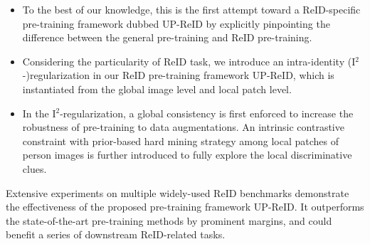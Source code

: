 \documentclass[10pt,twocolumn,letterpaper]{article}
\begin{document}
\begin{itemize}

\item To the best of our knowledge, this is the first attempt toward a ReID-specific pre-training framework dubbed UP-ReID by explicitly pinpointing the difference between the general pre-training and ReID pre-training.


\item Considering the particularity of ReID task, we introduce an intra-identity (I$^2$-)regularization in our ReID pre-training framework UP-ReID, which is instantiated from the global image level and local patch level.


\item In the I$^2$-regularization, a global consistency is first enforced to increase the robustness of pre-training to data augmentations. An intrinsic contrastive constraint with prior-based hard mining strategy among local patches of person images is further introduced to fully explore the local discriminative clues.




\end{itemize}

Extensive experiments on multiple widely-used ReID benchmarks demonstrate the effectiveness of the proposed pre-training framework UP-ReID. It outperforms the state-of-the-art pre-training methods by prominent margins, and could benefit a series of downstream ReID-related tasks.
\end{document}
